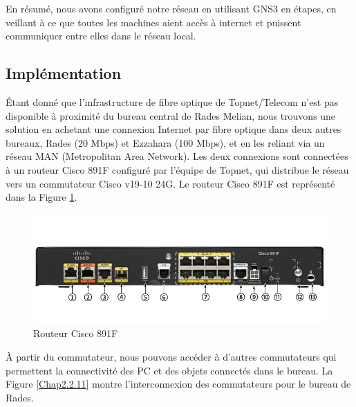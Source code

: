 En résumé, nous avons configuré notre réseau en utilisant GNS3 en étapes, en veillant à ce que toutes les machines aient accès à internet et puissent communiquer entre elles dans le réseau local. \\


  
\subsection{Implémentation}

Étant donné que l'infrastructure de fibre optique de Topnet/Telecom n'est pas disponible à proximité du bureau central de Rades Melian, nous trouvons une solution en achetant une connexion Internet par fibre optique dans deux autres bureaux, Rades (20 Mbps) et Ezzahara (100 Mbps), et en les reliant via un réseau MAN (Metropolitan Area Network). Les deux connexions sont connectées à un routeur Cisco 891F configuré par l'équipe de Topnet, qui distribue le réseau vers un commutateur Cisco v19-10 24G. Le routeur Cisco 891F est représenté dans la Figure \ref{Chap2.2.10}.

\begin{figure}[H]
\centering
\includegraphics[width=15cm]{Images/C891F_1.jpg}
\caption{Routeur Cisco 891F}
\label{Chap2.2.10}
\end{figure}

À partir du commutateur, nous pouvons accéder à d'autres commutateurs qui permettent la connectivité des PC et des objets connectés dans le bureau. La Figure \ref{Chap2.2.11} montre l'interconnexion des commutateurs pour le bureau de Rades.

